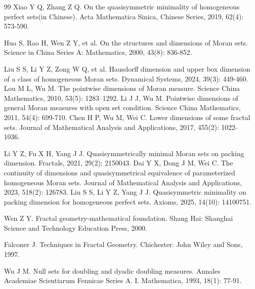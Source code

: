\documentclass[reqno]{amsart}
\theoremstyle{plain}
\theoremstyle{definition}
\theoremstyle{remark}
\numberwithin{equation}{section} \DeclareMathOperator\intr{int}
\begin{document}
\begin{thebibliography}{99}
 Xiao Y Q, Zhang Z Q. On the quasisymmetric minimality of homogeneous perfect sets(in Chinese). Acta Mathematica Sinica, Chinese Series, 2019, 62(4): 573-590.


 Hua S, Rao H, Wen Z Y,  et al. \newblock On the structures and dimensions of Moran sets. Science in China Series A: Mathematics, 2000, 43(8): 836-852.


 Liu S S, Li Y Z, Zong W Q, et al. \newblock Hausdorff dimension and upper box dimension of a class of homogeneous Moran sets. Dynamical Systems, 2024, 39(3): 449-460.
 Lou M L, Wu M.
\newblock The pointwise dimensions of Moran measure. Science China Mathematics, 2010, 53(5): 1283--1292.
Li J J, Wu M. \newblock Pointwise dimensions of general Moran measures with open set condition.   Science China Mathematics, 2011, 54(4): 699-710.
 Chen H P, Wu M, Wei C. \newblock Lower dimensions of some fractal sets. Journal of Mathematical Analysis and Applications, 2017, 455(2): 1022-1036.


 Li Y Z, Fu X H, Yang  J J. \newblock  Quasisymmetrically minimal Moran sets on packing dimension. Fractals, 2021, 29(2): 2150043.
 Dai Y X, Dong J M, Wei C. \newblock   The continuity of dimensions and quasisymmetrical equivalence of parameterized homogeneous Moran sets. Journal of Mathematical Analysis and Applications,  2023, 518(2):  126783.
Liu S S, Li Y Z, Yang J J. \newblock  Quasisymmetric minimality on packing dimension for homogeneous perfect sets.  Axioms, 2025, 14(10): 14100751.


 Wen Z Y. \newblock Fractal geometry-mathematical foundation. Shang Hai: Shanghai Science and Technology Education Press, 2000.

 Falconer J. \newblock Techniques in Fractal Geometry. Chichester: John Wiley and Sons, 1997.

 Wu J M. \newblock Null sets for doubling and dyadic doubling measures. Annales Academiae Scientiarum Fennicae Series A. I. Mathematica, 1993, 18(1): 77-91.



\end{thebibliography}
\end{document}
